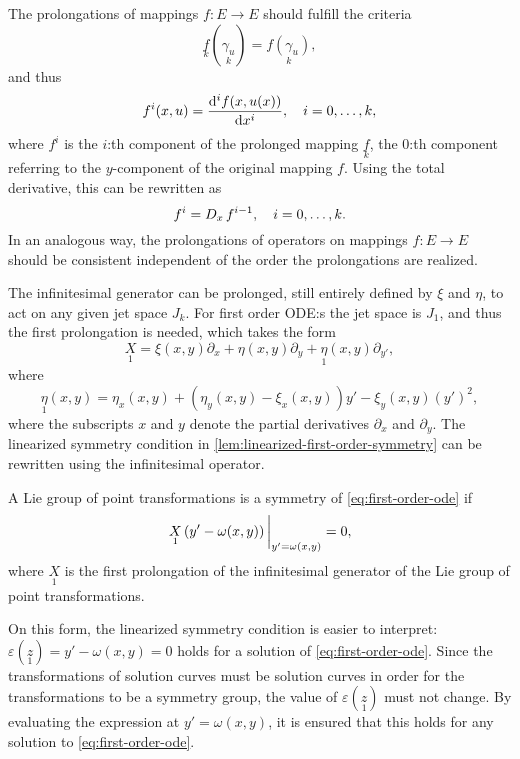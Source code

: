 The prolongations of mappings \(f: E \to E\) should fulfill the criteria
\begin{equation}
  \underset{k}{f}(\underset{k}{\gamma_u}) = \underset{k}{f(\gamma_u)},
\end{equation}
and thus 
\begin{equation}
  f^i(x, u) = \dv[i]{f(x, u(x))}{x}\qc i = 0, \dots, k,
\end{equation}
where \(f^i\) is the \(i\):th component of the prolonged mapping \(\underset{k}{f}\), the 0:th component referring to the \(y\)-component of the original mapping \(f\).
Using the total derivative, this can be rewritten as
\begin{equation}
  f^i = \tD{x} f^{i-1} \qc i = 0, \dots, k.
\end{equation}
In an analogous way, the prolongations of operators on mappings \(f: E \to E\) should be consistent independent of the order the prolongations are realized. %

The infinitesimal generator can be prolonged, still entirely defined by \(\xi\) and \(\eta\), to act on any given jet space \(J_k\).
For first order ODE:s the jet space is \(J_1\), and thus the first prolongation is needed, which takes the form
\begin{equation}
  \underset{1}{X} = \xi(x,y) \partial_x + \eta(x,y) \partial_y + \underset{1}{\eta}(x,y) \partial_{y'},
\end{equation}
where
\begin{equation}
  \underset{1}{\eta}(x,y) =
  \eta_x(x,y) + (\eta_y(x,y) - \xi_x(x,y)) y' - \xi_y(x,y) \left(y'\right)^2,
\end{equation}
where the subscripts \(x\) and \(y\) denote the partial derivatives \(\partial_x\) and \(\partial_y\).
The linearized symmetry condition in \cref{lem:linearized-first-order-symmetry} can be rewritten using the infinitesimal operator.
\begin{lem} \label{lem:linearized-first-order-symmetry-infinitesimal}
  A Lie group of point transformations is a symmetry of \cref{eq:first-order-ode} if
  \begin{equation} \label{eq:linearized-first-order-symmetry}
    \eval{\underset{1}{X}\left(y' - \omega(x,y)\right)}_{y' = \omega(x,y)} = 0,
  \end{equation}
  where \(\underset{1}{X}\) is the first prolongation of the infinitesimal generator of the Lie group of point transformations.
\end{lem}
On this form, the linearized symmetry condition is easier to interpret:
\(\varepsilon(\underset{1}{z}) = y' - \omega(x,y) = 0\) holds for a solution of \cref{eq:first-order-ode}.
Since the transformations of solution curves must be solution curves in order for the transformations to be a symmetry group, the value of \(\varepsilon(\underset{1}{z})\) must not change.
By evaluating the expression at \(y' = \omega(x,y)\), it is ensured that this holds for any solution to \cref{eq:first-order-ode}.

